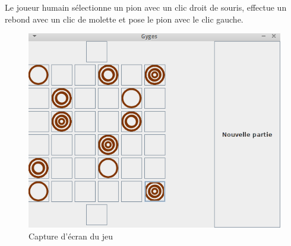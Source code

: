 		\vspace{1em}
		Le joueur humain sélectionne un pion avec un clic droit de souris, effectue
		un rebond avec un clic de molette et pose le pion avec le clic gauche.
		
		\begin{figure}[h!]
			\centering
			\includegraphics[width=\textwidth]{images/uiPlaying.png}
			\caption{Capture d'écran du jeu}
			\label{fig:screenshot_game}
		\end{figure}
